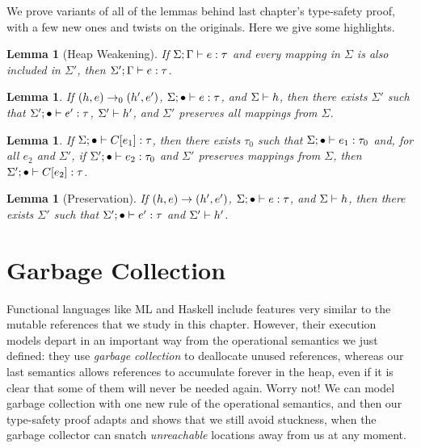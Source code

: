 \documentclass{amsbook}
\newtheorem{lemma}[theorem]{Lemma}
\theoremstyle{definition}
\theoremstyle{remark}
\numberwithin{section}{chapter}
\numberwithin{equation}{chapter}
\begin{document}
We prove variants of all of the lemmas behind last chapter's type-safety proof, with a few new ones and twists on the originals.
Here we give some highlights.

\begin{lemma}[Heap Weakening]
  If $\Sigma; \Gamma \vdash e : \tau$ and every mapping in $\Sigma$ is also included in $\Sigma'$, then $\Sigma'; \Gamma \vdash e : \tau$.
\end{lemma}

\begin{lemma}
  If $(h, e) \to_0 (h', e')$, $\Sigma; \bullet \vdash e : \tau$, and $\Sigma \vdash h$, then there exists $\Sigma'$ such that $\Sigma'; \bullet \vdash e' : \tau$, $\Sigma' \vdash h'$, and $\Sigma'$ preserves all mappings from $\Sigma$.
\end{lemma}

\begin{lemma}
  If $\Sigma; \bullet \vdash C[e_1] : \tau$, then there exists $\tau_0$ such that $\Sigma; \bullet \vdash e_1 : \tau_0$ and, for all $e_2$ and $\Sigma'$, if $\Sigma'; \bullet \vdash e_2 : \tau_0$ and $\Sigma'$ preserves mappings from $\Sigma$, then $\Sigma'; \bullet \vdash C[e_2] : \tau$.
\end{lemma}

\begin{lemma}[Preservation]
  If $(h, e) \to (h', e')$, $\Sigma; \bullet \vdash e : \tau$, and $\Sigma \vdash h$, then there exists $\Sigma'$ such that $\Sigma'; \bullet \vdash e' : \tau$ and $\Sigma' \vdash h'$.
\end{lemma}


\section{Garbage Collection}

Functional languages like ML and Haskell include features very similar to the mutable references that we study in this chapter.
However, their execution models depart in an important way from the operational semantics we just defined: they use \emph{garbage collection} to deallocate unused references, whereas our last semantics allows references to accumulate forever in the heap, even if it is clear that some of them will never be needed again.
Worry not!
We can model garbage collection with one new rule of the operational semantics, and then our type-safety proof adapts and shows that we still avoid stuckness, when the garbage collector can snatch \emph{unreachable} locations away from us at any moment.
\end{document}
